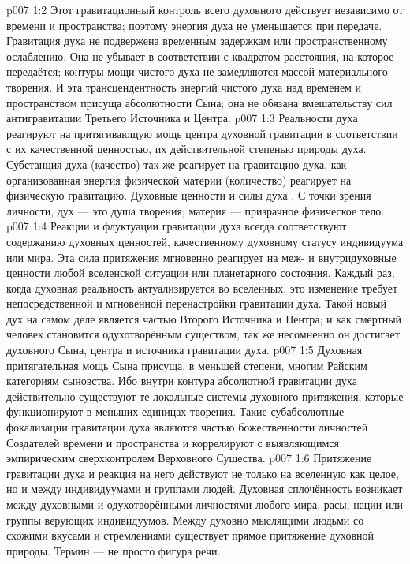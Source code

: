 \vs p007 1:2 Этот гравитационный контроль всего духовного действует независимо от времени и пространства; поэтому энергия духа не уменьшается при передаче. Гравитация духа не подвержена временн\'ым задержкам или пространственному ослаблению. Она не убывает в соответствии с квадратом расстояния, на которое передаётся; контуры мощи чистого духа не замедляются массой материального творения. И эта трансцендентность энергий чистого духа над временем и пространством присуща абсолютности Сына; она не обязана вмешательству сил антигравитации Третьего Источника и Центра.
\vs p007 1:3 Реальности духа реагируют на притягивающую мощь центра духовной гравитации в соответствии с их качественной ценностью, их действительной степенью природы духа. Субстанция духа (качество) так же реагирует на гравитацию духа, как организованная энергия физической материи (количество) реагирует на физическую гравитацию. Духовные ценности и силы духа . С точки зрения личности, дух --- это душа творения; материя --- призрачное физическое тело.
\vs p007 1:4 Реакции и флуктуации гравитации духа всегда соответствуют содержанию духовных ценностей, качественному духовному статусу индивидуума или мира. Эта сила притяжения мгновенно реагирует на меж\hyp{} и внутридуховные ценности любой вселенской ситуации или планетарного состояния. Каждый раз, когда духовная реальность актуализируется во вселенных, это изменение требует непосредственной и мгновенной перенастройки гравитации духа. Такой новый дух на самом деле является частью Второго Источника и Центра; и как смертный человек становится одухотворённым существом, так же несомненно он достигает духовного Сына, центра и источника гравитации духа.
\vs p007 1:5 \pc Духовная притягательная мощь Сына присуща, в меньшей степени, многим Райским категориям сыновства. Ибо внутри контура абсолютной гравитации духа действительно существуют те локальные системы духовного притяжения, которые функционируют в меньших единицах творения. Такие субабсолютные фокализации гравитации духа являются частью божественности личностей Создателей времени и пространства и коррелируют с выявляющимся эмпирическим сверхконтролем Верховного Существа.
\vs p007 1:6 Притяжение гравитации духа и реакция на него действуют не только на вселенную как целое, но и между индивидуумами и группами людей. Духовная сплочённость возникает между духовными и одухотворёнными личностями любого мира, расы, нации или группы верующих индивидуумов. Между духовно мыслящими людьми со схожими вкусами и стремлениями существует прямое притяжение духовной природы. Термин  --- не просто фигура речи.
